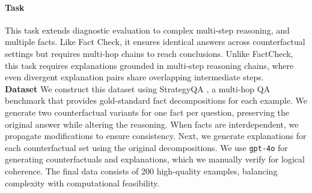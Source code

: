\paragraph{Task} This task extends diagnostic evaluation to complex multi-step reasoning, and multiple facts. Like Fact Check, it ensures identical answers across counterfactual settings but requires multi-hop chains to reach conclusions. Unlike FactCheck, this task requires explanations grounded in multi-step reasoning chains, where even divergent explanation pairs share overlapping intermediate steps. \\ 
\noindent \textbf{Dataset} We construct this dataset using StrategyQA \citep{Geva2021DidAU}, a multi-hop QA benchmark that provides gold-standard fact decompositions for each example. We generate two counterfactual variants for one fact per question, preserving the original answer while altering the reasoning. When facts are interdependent, we propagate modifications to ensure consistency. Next, we generate explanations for each counterfactual set using the original decompositions. We use \texttt{gpt-4o} for generating counterfactuals and explanations, which we manually verify for logical coherence. The final data consists of 200 high-quality examples, balancing complexity with computational feasibility. 